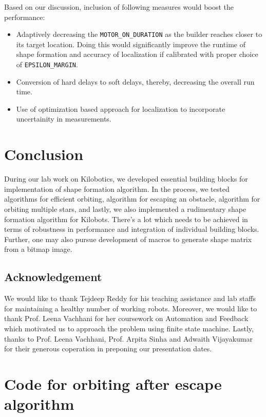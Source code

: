 \documentclass{report}[12pt]
\begin{document}
Based on our discussion, inclusion of following measures would boost the performance:
\begin{itemize}
	\item Adaptively decreasing the \texttt{MOTOR\_ON\_DURATION} as the builder reaches closer to its target location. Doing this would significantly improve the runtime of shape formation and accuracy of localization if calibrated with proper choice of \texttt{EPSILON\_MARGIN}.
	\item Conversion of hard delays to soft delays, thereby, decreasing the overall run time.
	\item Use of optimization based approach for localization to incorporate uncertainity in measurements.
\end{itemize}

\chapter{Conclusion}
During our lab work on Kilobotics, we developed essential building blocks for implementation of shape formation algorithm. In the process, we tested algorithms for efficient orbiting, algorithm for escaping an obstacle, algorithm for orbiting multiple stars, and lastly, we also implemented a rudimentary shape formation algorithm for Kilobots. There's a lot which needs to be achieved in terms of robustness in performance and integration of individual building blocks. Further, one may also pursue development of macros to generate shape matrix from a bitmap image.
\section{Acknowledgement}
We would like to thank Tejdeep Reddy for his teaching assistance and lab staffs for maintaining a healthy number of working robots. Moreover, we would like to thank Prof. Leena Vachhani for her coursework on Automation and Feedback which motivated us to approach the problem using finite state machine. Lastly, thanks to Prof. Leena Vachhani, Prof. Arpita Sinha and Adwaith Vijayakumar for their generous coperation in preponing our presentation dates. 
\appendix
\chapter{Code for orbiting after escape algorithm}
\label{c_orbit}
\end{document}
